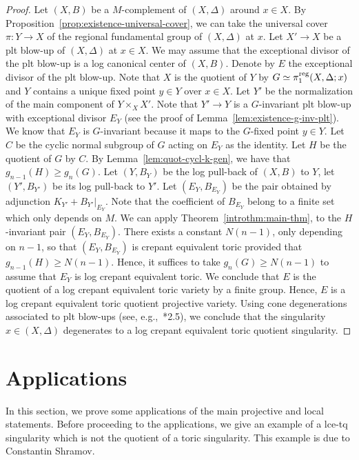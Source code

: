 \documentclass{amsart}
\theoremstyle{remark}
\numberwithin{equation}{section}
\begin{document}
\begin{proof}
Let $(X,B)$ be a $M$-complement of $(X,\Delta)$ around $x\in X$.
By Proposition~\ref{prop:existence-universal-cover}, we can take
the universal cover $\pi\colon Y\rightarrow X$ of the regional 
fundamental group of $(X,\Delta)$ at $x$.
Let $X'\rightarrow X$ be a plt blow-up of $(X,\Delta)$ at $x\in X$.
We may assume that the exceptional divisor of the plt blow-up
is a log canonical center of $(X,B)$.
Denote by $E$ the exceptional divisor of the plt blow-up.
Note that $X$ is the quotient of $Y$ by $G\simeq \pi_1^{\rm reg}(X,\Delta;x)$ and $Y$ contains a unique fixed point $y\in Y$ over $x\in X$.
Let $Y'$ be the normalization of the main component of $Y\times_X X'$.
Note that $Y'\rightarrow Y$ is a $G$-invariant plt blow-up with exceptional divisor $E_Y$
(see the proof of Lemma~\ref{lem:existence-g-inv-plt}).
We know that $E_Y$ is $G$-invariant because it maps to the $G$-fixed point $y\in Y$.
Let $C$ be the cyclic normal subgroup of $G$ acting on $E_Y$ as the identity.
Let $H$ be the quotient of $G$ by $C$.
By Lemma~\ref{lem:quot-cycl-k-gen}, we have that $g_{n-1}(H) \geq g_n(G)$.
Let $(Y,B_Y)$ be the log pull-back of $(X,B)$ to $Y$, let $(Y',B_{Y'})$ be its log pull-back to $Y'$.
Let $(E_Y,B_{E_Y})$ be the pair obtained by adjunction
$K_{Y'}+B_{Y'}|_{E_Y}$.
Note that the coefficient of $B_{E_Y}$ belong to a finite set
which only depends on $M$.
We can apply Theorem~\ref{introthm:main-thm},
to the $H$-invariant pair $(E_Y,B_{E_Y})$. 
There exists a constant $N(n-1)$,
only depending on $n-1$, so that $(E_Y,B_{E_Y})$ is crepant equivalent  toric
provided that $g_{n-1}(H)\geq N(n-1)$.
Hence, it suffices to take $g_n(G)\geq N(n-1)$
to assume that $E_Y$ is log crepant equivalent  toric.
We conclude that $E$ is the quotient of a log crepant equivalent  toric variety by a finite group.
Hence, $E$ is a log crepant equivalent  toric quotient projective variety.
Using cone degenerations associated to plt blow-ups (see, e.g.,~\cite{HLM19}*{2.5}), 
we conclude that the singularity $x\in (X,\Delta)$ degenerates
to a log crepant equivalent  toric quotient singularity.
\end{proof}

\section{Applications}\label{sec:app}
In this section, we prove some applications of the main projective and local statements.
Before proceeding to the applications, we give an example of a lce-tq singularity which is not the quotient of a toric singularity.
This example is due to Constantin Shramov.
\end{document}
